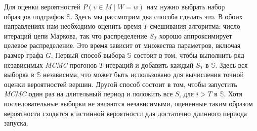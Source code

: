 Для оценки вероятностей $P(v \in M \mid W=w)$ нам нужно выбрать набор образцов
подграфов $\mathbb{S}$.  Здесь мы рассмотрим два способа сделать это.  В обоих
направлениях нам необходимо оценить время $T$ смешивания алгоритма: число
итераций цепи Маркова, так что распределение $S_T$ хорошо аппроксимирует
целевое распределение.  Это время зависит от множества параметров, включая
размер графа $G$.  Первый способ выбора $\mathbb{S}$ состоит в том, чтобы
выполнить ряд независимых \emph{MCMC}-прогонов $T$-итераций и добавить каждый
$S_T$ в $\mathbb{S}$.  Здесь вся выборка в $\mathbb{S}$ независима, что может
быть использовано для вычисления точной оценки вероятностей вершин.  Другой
способ состоит в том, чтобы запустить \emph{MCMC} один раз на длительный период
и положить все $S_i$ для $i>T$ в $\mathbb{S}$.  Хотя последовательные выборки
не являются независимыми, оцененные таким образом вероятности сходятся
к истинной вероятности для достаточно длинного периода запуска.





